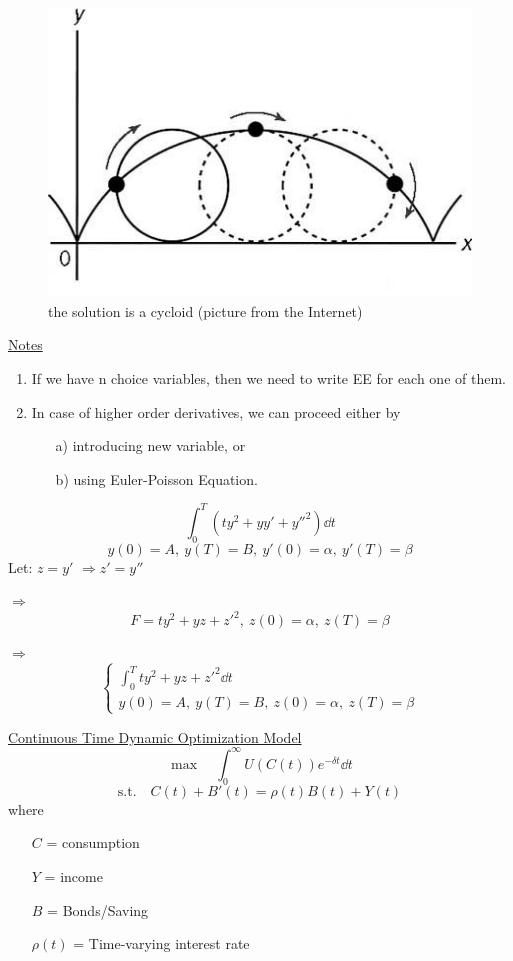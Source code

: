 \documentclass[twoside]{article}
\newcommand\imp{$\Longrightarrow$}
\begin{document}
\begin{figure}[htbp] 
    \centering
    \includegraphics[width=.5\textwidth]{figure/cycloid.jpg}
    \caption{the solution is a cycloid (picture from the Internet)}
\end{figure}

\underline{Notes}
\begin{enumerate}
    \item If we have n choice variables, then we need to write EE for each one of them.
    \item In case of higher order derivatives, we can proceed either by
    \begin{itemize}
        \item[a)] introducing new variable, or
        \item[b)] using Euler-Poisson Equation.
    \end{itemize}
\end{enumerate}
\begin{example}
\begin{equation}
    \int_0^T (t y^2 + y y' + {y''}^2) \dd t
\end{equation}
\[
    y(0) = A, ~ y(T) = B, ~ y'(0) = \alpha, ~ y'(T) = \beta
\]
Let: $z = y'$ \imp $z' = y''$

\imp 
$$F = t y^2 + y z + {z'}^2, ~ z(0)=\alpha, ~ z(T) = \beta$$

\imp \begin{equation}
    \begin{cases}
        \int_0^T t y^2 + y z + {z'}^2 \dd t\\[0.5em]
        y(0) = A, ~ y(T) = B, ~z(0)=\alpha, ~ z(T) = \beta
    \end{cases}
\end{equation}
\end{example}

\begin{example} \underline{Continuous Time Dynamic Optimization Model} 
\begin{equation}
    \max \quad \int_0^{\infty} U(C(t))e^{-\delta t} \dd t
\end{equation}        
\begin{equation}
    \text{s.t.} \quad C(t) + B'(t) = \rho(t) B(t) + Y(t)
\end{equation}
where 
\begin{itemize}
    \item [] $C$ = consumption
    \item [] $Y$ = income
    \item [] $B$ = Bonds/Saving
    \item [] $\rho(t)$ = Time-varying interest rate
\end{itemize}
\end{example} 
\end{document}
